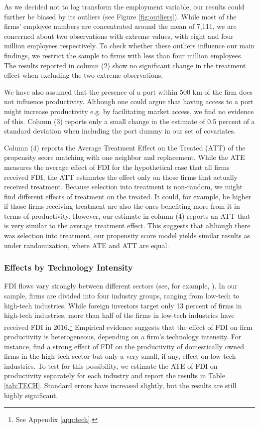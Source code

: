 \documentclass[a4paper,11pt]{scrartcl}
\begin{document}
As we decided not to log transform the employment variable, our results could further be biased by its outliers (see Figure \ref{fig:outliers}). While most of the firms' employee numbers are concentrated around the mean of 7,111, we are concerned about two observations with extreme values, with eight and four million employees respectively. To check whether these outliers influence our main findings, we restrict the sample to firms with less than four million employees. The results reported in column (2) show no significant change in the treatment effect when excluding the two extreme observations. 

We have also assumed that the presence of a port within 500 km of the firm does not influence productivity. Although one could argue that having access to a port might increase productivity e.g. by facilitating market access, we find no evidence of this.  Column (3) reports only a small change in the estimate of 0.5 percent of a standard deviation when including the port dummy in our set of covariates. 

Column (4) reports the Average Treatment Effect on the Treated (ATT) of the propensity score matching with one neighbor and replacement. While the ATE measures the average effect of FDI for the hypothetical case that all firms received FDI, the ATT estimates the effect only on those firms that actually received treatment. Because selection into treatment is non-random, we might find different effects of treatment on the treated. 
It could, for example, be higher if those firms receiving treatment are also the ones benefiting more from it in terms of productivity. 
 However, our estimate in column (4) reports an ATT that is very similar to the average treatment effect. This suggests that although there was selection into treatment, our propensity score model yields similar results as under randomization, where ATE and ATT are equal.

\subsubsection*{Effects by Technology Intensity}

FDI flows vary strongly between different sectors (see, for example, \citet{Smarzynska2004, Keller2009, Haskel2007}). In our sample, firms are divided into four industry groups, ranging from low-tech to high-tech industries. While foreign investors target only 13 percent of firms in high-tech industries, more than half of the firms in low-tech industries have received FDI in 2016.\footnote{See Appendix \ref{app:tech}.}  Empirical evidence suggests that the effect of FDI on firm productivity is heterogeneous, depending on a firm's technology intensity.
For instance, \citet{Keller2009} find a strong effect of FDI on the productivity of domestically owned firms in the high-tech sector but only a very small, if any, effect on low-tech industries. 
To test for this possibility, we estimate the ATE of FDI on productivity separately for each industry and report the results in Table \ref{tab:TECH}. Standard errors have increased slightly, but the results are still highly significant. 
\end{document}
